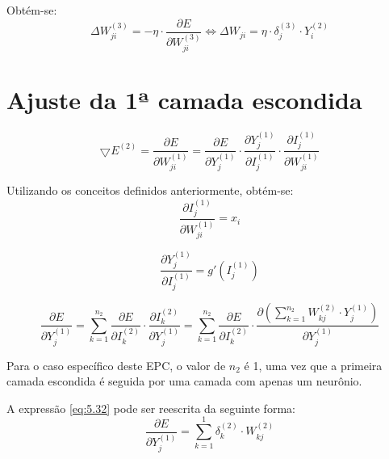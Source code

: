 \documentclass{article}
\begin{document}
\par Obtém-se:
\begin{equation}
  \Delta W_{ji}^{(3)} = -\eta \cdot \frac{\partial E}{\partial W_{ji}^{(3)}} \Longleftrightarrow
  \Delta W_{ji} = \eta \cdot \delta_{j}^{(3)} \cdot Y_{i}^{(2)}
  \label{eq:5.14}
\end{equation}


\section{Ajuste da 1ª camada escondida}
\begin{equation}
  \bigtriangledown E^{(2)} = \frac{\partial E}{\partial W^{(1)}_{ji}} =
  \frac{\partial E}{\partial Y^{(1)}_{j}}
    \cdot
  \frac{\partial Y^{(1)}_{j}}{\partial I^{(1)}_{j}}
    \cdot
  \frac{\partial I^{(1)}_{j}}{\partial W^{(1)}_{ji}}
  \label{eq:5.29}
\end{equation}

\par Utilizando os conceitos definidos anteriormente, obtém-se:
\begin{equation}
  \frac{\partial I_{j}^{(1)}}{\partial W_{ji}^{(1)}} = x_{i}
  \label{eq:5.30}
\end{equation}

\begin{equation}
\frac{\partial Y_{j}^{(1)}}{\partial I_{j}^{(1)}} = g'(I_{j}^{(1)})
\label{eq:5.31}
\end{equation}

\begin{equation}
\frac{\partial E}{\partial Y_{j}^{(1)}} = \sum_{k=1}^{n_{2}} \frac{\partial E}{\partial I_{k}^{(2)}} \cdot \frac{\partial I_{k}^{(2)}}{\partial Y_{j}^{(1)}} = \sum_{k=1}^{n_{2}}
\frac{ \partial E}{\partial I_{k}^{(2)}} \cdot \frac{\partial(\sum_{k=1}^{n_{2}} W_{kj}^{(2)} \cdot Y_{j}^{(1)})}{\partial Y_{j}^{(1)}}
\label{eq:5.32}
\end{equation}

\par Para o caso específico deste EPC, o valor de $n_{2}$ é 1, uma vez que a primeira camada escondida é seguida por uma camada com apenas um neurônio.

\par A expressão \eqref{eq:5.32} pode ser reescrita da seguinte forma:
  \begin{equation}
    \frac{\partial E}{\partial Y_{j}^{(1)}} = \sum_{k=1}^{1} \delta^{(2)}_{k} \cdot W^{(2)}_{kj}
    \label{eq:5.34}
  \end{equation}
\end{document}

